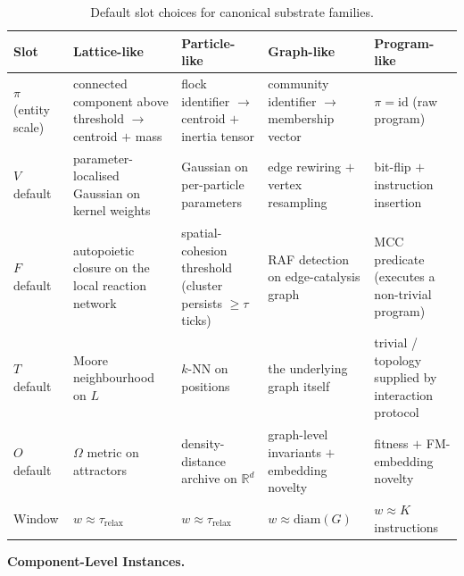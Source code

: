 \documentclass[journal]{IEEEtran}
\theoremstyle{plain}
\theoremstyle{definition}
\theoremstyle{plain}
\newcounter{topic}[subsection]
\newcommand{\topic}[1]{%
  \refstepcounter{topic}%
  \par\smallskip\noindent\textbf{#1.}\ }
\newcommand{\R}{\mathbb{R}}
\begin{document}
\begin{table}[!t]
\caption{Default slot choices for canonical substrate families.}
\label{tab:defaults}
\centering
\renewcommand{\arraystretch}{1.15}
\setlength{\tabcolsep}{3pt}
\scriptsize
\begin{tabular}{@{}>{\raggedright\arraybackslash}p{} >{\raggedright\arraybackslash}p{} >{\raggedright\arraybackslash}p{} >{\raggedright\arraybackslash}p{} >{\raggedright\arraybackslash}p{}@{}}
\hline
\textbf{Slot} & \textbf{Lattice-like} & \textbf{Particle-like} & \textbf{Graph-like} & \textbf{Program-like} \\
\hline
$\pi$ (entity scale) &
  connected component above threshold $\to$ centroid $+$ mass &
  flock identifier $\to$ centroid $+$ inertia tensor &
  community identifier $\to$ membership vector &
  $\pi=\mathrm{id}$ (raw program) \\
$V$ default &
  parameter-localised Gaussian on kernel weights &
  Gaussian on per-particle parameters &
  edge rewiring $+$ vertex resampling &
  bit-flip $+$ instruction insertion \\
$F$ default &
  autopoietic closure on the local reaction network &
  spatial-cohesion threshold (cluster persists $\geq \tau$ ticks) &
  RAF detection on edge-catalysis graph &
  MCC predicate (executes a non-trivial program) \\
$T$ default &
  Moore neighbourhood on $L$ &
  $k$-NN on positions &
  the underlying graph itself &
  trivial / topology supplied by interaction protocol \\
$O$ default &
  $\Omega$ metric on attractors &
  density-distance archive on $\R^{d}$ &
  graph-level invariants $+$ embedding novelty &
  fitness $+$ FM-embedding novelty \\
Window &
  $w \approx \tau_{\mathrm{relax}}$ &
  $w \approx \tau_{\mathrm{relax}}$ &
  $w \approx \mathrm{diam}(G)$ &
  $w \approx K$ instructions \\
\hline
\end{tabular}
\end{table}

\topic{Component-Level Instances}\label{sec:components}
\end{document}
